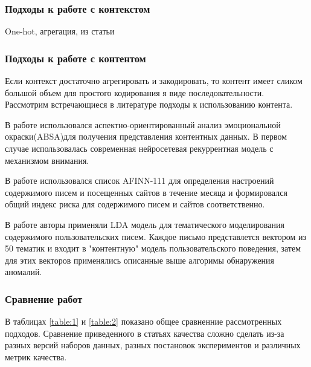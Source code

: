\subsubsection{Подходы к работе с контекстом}
One-hot, агрегация, из статьи \cite{8444978}

\subsubsection{Подходы к работе с контентом}

Если контекст достаточно агрегировать и закодировать, то контент имеет сликом большой объем для простого кодирования я виде последовательности. Рассмотрим встречающиеся в литературе подходы к использованию контента.

В работе \cite{absa} использовался аспектно-ориентированный анализ эмоциональной окраски(ABSA)для получения представления контентных данных. В первом случае использовалась современная нейросетевая рекуррентная модель с механизмом внимания.

В работе \cite{suites} использовался список AFINN-111 для определения настроений\cite{nielsen11} содержимого писем и посещенных сайтов в течение месяца и формировался общий индекс риска для содержимого писем и сайтов соответственно.

В работе \cite{anomalyalgo} авторы применяли LDA модель для тематического моделирования содержимого пользовательских писем. Каждое письмо представлется вектором из 50 тематик и входит в "контентную" модель пользовательского поведения, затем для этих векторов применялись описанные выше алгоримы обнаружения аномалий.


\subsubsection{Сравнение работ}
В таблицах \ref{table:1} и \ref{table:2} показано общее сравненние рассмотренных подходов. Сравнение приведенного в статьях качества сложно сделать из-за разных версий наборов данных, разных постановок экспериментов и различных метрик качества.

